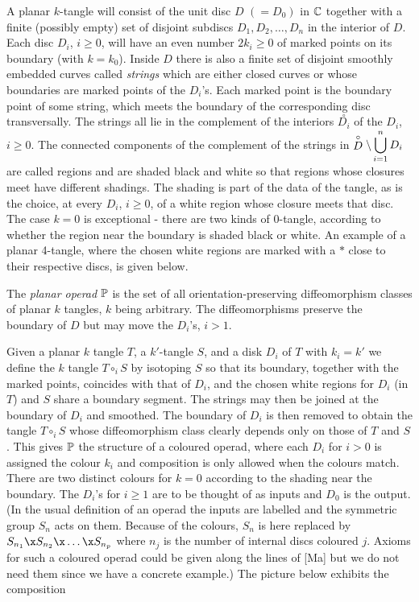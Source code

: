 A planar $k$-tangle will consist of the unit disc
$D$ $(=D_0)$ in $\Bbb C$ together with a finite
(possibly empty) set of disjoint subdiscs
$D_1,D_2,\dots ,D_n$ in the interior of $D$. Each
disc $D_i$, $i\geq 0$, will have an even number
$2k_i\geq 0$ of marked points on its boundary
(with $k=k_0$). Inside $D$ there is also a finite
set of disjoint smoothly embedded curves called
{\it strings} which are either closed curves or
whose boundaries are marked points of the $D_i$'s.
Each marked point is the boundary point of some
string, which meets the boundary of the
corresponding disc transversally. The strings all
lie in the complement of the interiors $\stackrel{\circ}{D_i}$
of the $D_i$, $i\geq 0$. The connected components of
the complement of the strings in 
$\displaystyle{\stackrel{\circ}{D}\backslash \bigcup^n_{i=1}D_i}$ 
are called regions
and are shaded black and white so that regions
whose closures meet have different shadings. The
shading is part of the data of the tangle, as is
the choice, at every $D_i$, $i\geq 0$, of a white
region whose closure meets that disc. 
The case $k=0$ is exceptional - 
there are two kinds of 0-tangle, according to
whether the region near the boundary is shaded
black or white. An example of a planar 4-tangle,
where the  chosen white regions are marked with a
$*$ close to their respective discs, is given
below.

\[

\]
The {\it planar operad} $\Bbb P$ is the set of all
orientation-preserving diffeomorphism classes of
planar $k$ tangles, $k$ being arbitrary. The
diffeomorphisms preserve the boundary of $D$ but
may move the $D_i$'s, $i>1$.

Given a planar $k$ tangle $T$, a $k'$-tangle $S$,
and a disk $D_i$ of $T$ with $k_i=k'$ we define
the  $k$ tangle $T\circ_i S$ by isotoping $S$ so
that its boundary, together with the marked
points, coincides with that of $D_i$, and the
chosen white regions for $D_i$ (in $T$) and $S$ share a
boundary segment.  The strings may then be joined
at the boundary of $D_i$ and smoothed. The
boundary of $D_i$ is then removed to obtain the
tangle $T\circ_i S$ whose diffeomorphism class
clearly depends only on those of $T$ and $S$.
This gives $\Bbb P$ the structure of a coloured
operad, where each $D_i$ for $i>0$ is assigned
the colour $k_i$ and composition is only allowed
when the colours match. There are two distinct
colours for $k=0$ according to the shading near
the boundary. The $D_i$'s for $i\geq 1$ are to be
thought of as inputs and $D_0$ is the output. (In
the usual definition of an operad the inputs are
labelled and the symmetric group $S_n$ acts on
them. Because of the colours, $S_n$ is here replaced by
$S_{n_1}\x S_{n_2}\x\dots\x S_{n_p}$ where  $n_j$ is the
number of internal discs coloured $j$.
Axioms for such a coloured operad could be given
along the lines of [Ma] but we do not need them
since we have a concrete example.) The picture
below exhibits the composition

